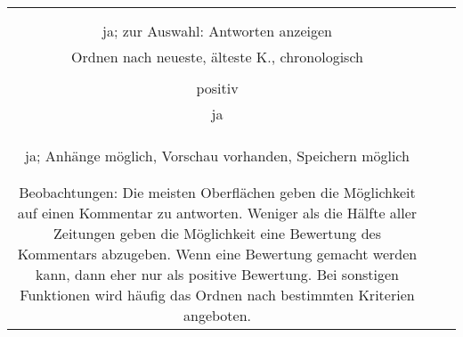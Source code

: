 \begin{landscape}
\begin{tabular}{ccc}
{		\\
		\\
		ja; zur Auswahl: Antworten anzeigen\\
		Ordnen nach neueste, älteste K., chronologisch\\
		&
		\\
		positiv\\
		ja\\
		\\
		&
		\\
		\\
		ja; Anhänge möglich, Vorschau vorhanden, Speichern möglich\\
		\\
		&
		\\ \hline
		
Beobachtungen:
Die meisten Oberflächen geben die Möglichkeit auf einen Kommentar zu antworten. Weniger als die Hälfte aller Zeitungen geben die Möglichkeit eine Bewertung des Kommentars abzugeben. Wenn eine Bewertung gemacht werden kann, dann eher nur als positive Bewertung. Bei sonstigen Funktionen wird häufig das Ordnen nach bestimmten Kriterien angeboten. 
		
		


}
\end{tabular}
\end{landscape}
